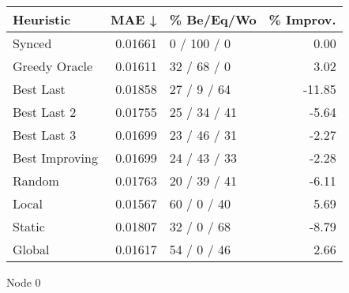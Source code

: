 \begin{tabular}{lrlr}
\toprule
\textbf{Heuristic} & \textbf{MAE ↓} & \textbf{\% Be/Eq/Wo} & \textbf{\% Improv.} \\
\midrule
            Synced &        0.01661 &          0 / 100 / 0 &                0.00 \\
     Greedy Oracle &        0.01611 &          32 / 68 / 0 &                3.02 \\
         Best Last &        0.01858 &          27 / 9 / 64 &              -11.85 \\
       Best Last 2 &        0.01755 &         25 / 34 / 41 &               -5.64 \\
       Best Last 3 &        0.01699 &         23 / 46 / 31 &               -2.27 \\
    Best Improving &        0.01699 &         24 / 43 / 33 &               -2.28 \\
            Random &        0.01763 &         20 / 39 / 41 &               -6.11 \\
             Local &        0.01567 &          60 / 0 / 40 &                5.69 \\
            Static &        0.01807 &          32 / 0 / 68 &               -8.79 \\
            Global &        0.01617 &          54 / 0 / 46 &                2.66 \\
\bottomrule
\end{tabular}
\caption{Node 0}
\label{tab:non_lr01_le2_bs2_0}
